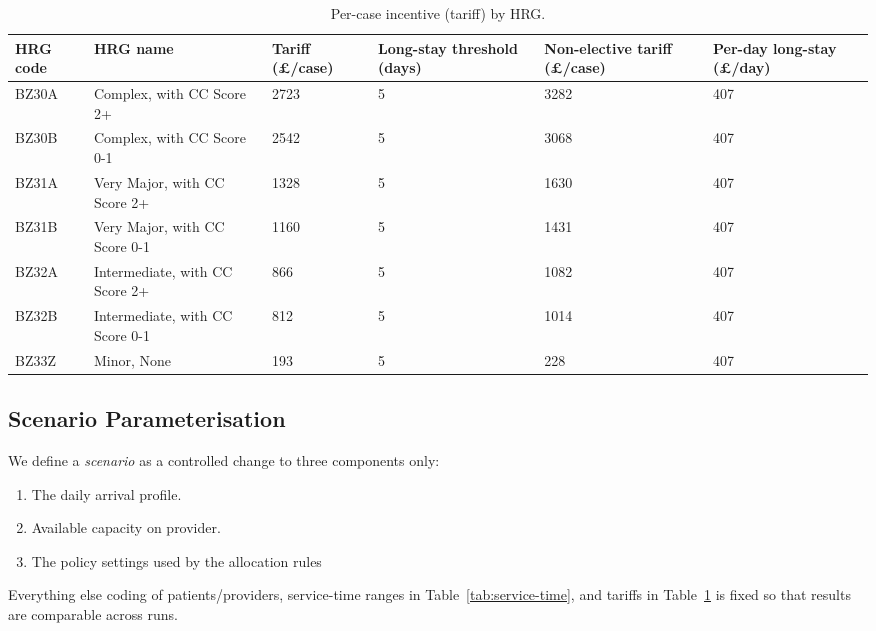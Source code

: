 \documentclass[ %
                    author={Nattanan Nawakitbamrung},
                supervisor={Dr. Sébastien Rochat},
                    degree={MSc},
                     title={Developing and Evaluating the Impact of a Single Patient Treatment List (PTL) for an NHS Integrated Care System},
                  subtitle={},
                      type={},
                      year={2025}]{dissertation}
\begin{document}
\begin{table}[htbp]
\centering
\renewcommand{\arraystretch}{1.25}    
\setlength{\tabcolsep}{6pt}
\begin{center}
\begin{tabular}{p{1.5cm} p{5.5cm} p{1.5cm} p{1.5cm} p{1.5cm} p{1.5cm}}
\hline
     \textbf{HRG code} & \textbf{HRG name} &
    \textbf{Tariff (\pounds/case)} &
    \textbf{Long-stay threshold (days)} &
    \textbf{Non-elective tariff (\pounds/case)} &
    \textbf{Per-day long-stay (\pounds/day)} \\
     \hline
     BZ30A &	Complex, with CC Score 2+	& 2723	& 5	&3282&	407\\
     BZ30B &	Complex, with CC Score 0-1	& 2542	& 5	&3068	&407\\
     BZ31A &	Very Major, with CC Score 2+	& 1328	& 5	&1630	& 407\\
     BZ31B &	Very Major, with CC Score 0-1	& 1160	& 5	& 1431	& 407\\
     BZ32A &	Intermediate, with CC Score 2+ & 866 & 5 &  1082 & 407\\
     BZ32B &	Intermediate, with CC Score 0-1 & 812 & 5 & 1014 & 407\\
     BZ33Z &	Minor, None & 193	& 5	& 228 & 407\\
     \hline
\end{tabular}
\end{center}
\caption{Per-case incentive (tariff) by HRG.}
\label{tab:tariff}
\end{table}

\subsection{Scenario Parameterisation}\label{subsec:scenario-param}
We define a \textit{scenario} as a controlled change to three components only: 
\begin{enumerate}
    \item The daily arrival profile.
    \item Available capacity on provider.
    \item The policy settings used by the allocation rules
\end{enumerate}
Everything else coding of patients/providers, service-time ranges in Table~\ref{tab:service-time}, and tariffs in Table~\ref{tab:tariff} is fixed so that results are comparable across runs.
\end{document}
